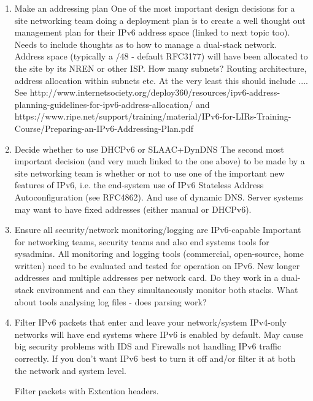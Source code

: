 




\begin{enumerate}


\item Make an addressing plan
One of the most important design decisions for a site networking team doing a deployment plan is to create a well thought out management plan for their IPv6 address space (linked to next topic too). Needs to include thoughts as to how to manage a dual-stack network. Address space (typically a /48 - default RFC3177) will have been allocated to the site by its NREN or other ISP. How many subnets? Routing architecture, address allocation within subnets etc. At the very least this should include .... See http://www.internetsociety.org/deploy360/resources/ipv6-address-planning-guidelines-for-ipv6-address-allocation/   and https://www.ripe.net/support/training/material/IPv6-for-LIRs-Training-Course/Preparing-an-IPv6-Addressing-Plan.pdf  


\item Decide whether to use DHCPv6 or SLAAC+DynDNS
The second most important decision (and very much linked to the one above) to be made by a site networking team is whether or not to use one of the important new features of IPv6, i.e. the end-system use of  IPv6 Stateless Address Autoconfiguration (see RFC4862).  And use of dynamic DNS.  Server systems may want to have fixed addresses (either manual or DHCPv6).



\item Ensure all security/network monitoring/logging are IPv6-capable
Important for networking teams, security teams and also end systems tools for sysadmins. All monitoring and logging tools (commercial, open-source, home written) need to be evaluated and tested for operation on IPv6. New longer addresses and multiple addresses per network card. Do they work in a dual-stack environment and can they simultaneously monitor both stacks.  What about tools analysing log files - does parsing work?


\item Filter IPv6 packets that enter and leave your network/system
IPv4-only networks will have end systems where IPv6 is enabled by default. May cause big security problems with IDS and Firewalls not handling IPv6 traffic correctly. If you don't want IPv6 best to turn it off and/or filter it at both the network and system level.

Filter packets with Extention headers.


\end{enumerate}
